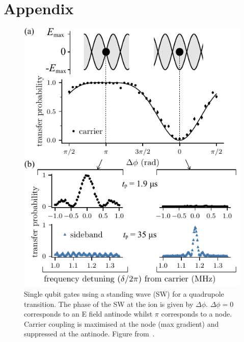 \documentclass[12pt]{iopart}
\begin{document}
\section{Appendix}
\begin{figure}[!h]
  \begin{center}
   \noindent\includegraphics[width=0.6\linewidth]{figures/Figure_2_v3.pdf}
  \end{center}
  \caption{Single qubit gates using a standing wave (SW) for a
    quadrupole transition. The phase of the SW at the ion is given by
    $\Delta\phi$. $\Delta\phi = 0$ corresponds to an E field antinode
    whilst $\pi$ corresponds to a node. Carrier coupling is maximised
    at the node (max gradient) and suppressed at the antinode. Figure
    from~\cite{saner_breaking_2023}.}

  \label{fig:app1}
\end{figure}

\hfill \break


\end{document}
